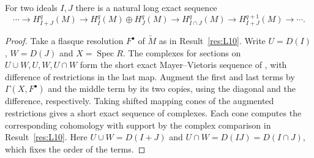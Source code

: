 \begin{corollary}\label{res:L11}
For two ideals \(I,J\) there is a natural long exact sequence
\[
 \cdots\to H_{I+J}^q(M)\to H_I^q(M)\oplus H_J^q(M)
 \to H_{I\cap J}^q(M)\to H_{I+J}^{q+1}(M)\to\cdots .
\]
\end{corollary}
\begin{proof}
Take a flasque resolution \(F^\bullet\) of \(\widetilde M\) as in
Result~\ref{res:L10}. Write \(U=D(I)\), \(W=D(J)\) and \(X=\operatorname{Spec}R\).
The complexes for sections on \(U\cup W,U,W,U\cap W\) form the short
exact Mayer--Vietoris sequence of \cite[H05]{homological}, with difference
of restrictions in the last map. Augment the first and last terms by
\(\Gamma(X,F^\bullet)\) and the middle term by its two copies, using the
diagonal and the difference, respectively. Taking shifted mapping cones
of the augmented restrictions gives a short exact sequence of complexes.
Each cone computes the corresponding cohomology with support by the
complex comparison in Result~\ref{res:L10}. Here \(U\cup W=D(I+J)\)
and \(U\cap W=D(IJ)=D(I\cap J)\), which fixes the order of the terms.
\end{proof}
